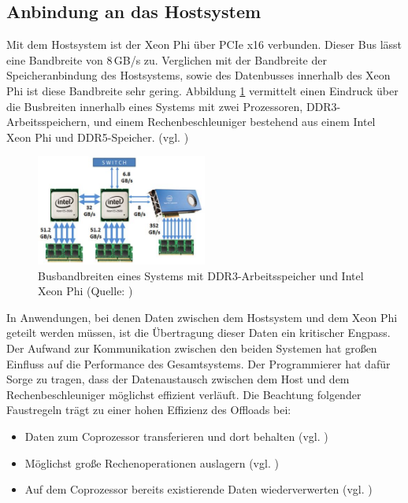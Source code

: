 \documentclass[../main.tex]{subfiles}
\begin{document}
\subsection{Anbindung an das Hostsystem}
Mit dem Hostsystem ist der Xeon Phi über PCIe x16 verbunden. Dieser Bus lässt eine Bandbreite von 8\,GB/s zu. Verglichen mit der Bandbreite der Speicheranbindung des Hostsystems, sowie des Datenbusses innerhalb des Xeon Phi ist diese Bandbreite sehr gering. Abbildung \ref{pic:xeonphiBandwidths} vermittelt einen Eindruck über die Busbreiten innerhalb eines Systems mit zwei Prozessoren, DDR3-Arbeitsspeichern, und einem Rechenbeschleuniger bestehend aus einem Intel Xeon Phi und DDR5-Speicher. (vgl. \cite{interDeviceCommunication})
\begin{figure}
    \centering 
       \includegraphics[width=0.5\textwidth]{../images/Schmidt/xeonphi_bandwidths.jpg} 
    \caption {Busbandbreiten eines Systems mit DDR3-Arbeitsspeicher und Intel Xeon Phi (Quelle: \parencite{interDeviceCommunication})}
    \label{pic:xeonphiBandwidths} 
\end{figure}
In Anwendungen, bei denen Daten zwischen dem Hostsystem und dem Xeon Phi geteilt werden müssen, ist die Übertragung dieser Daten ein kritischer Engpass. Der Aufwand zur Kommunikation zwischen den beiden Systemen hat großen Einfluss auf die Performance des Gesamtsystems. Der Programmierer hat dafür Sorge zu tragen, dass der Datenaustausch zwischen dem Host und dem Rechenbeschleuniger möglichst effizient verläuft. Die Beachtung folgender Faustregeln trägt zu einer hohen Effizienz des Offloads bei: 
\begin{itemize}
\item Daten zum Coprozessor transferieren und dort behalten (vgl. \cite{xeonphiJumpstart})
\item Möglichst große Rechenoperationen auslagern (vgl. \cite{xeonphiJumpstart})
\item Auf dem Coprozessor bereits existierende Daten wiederverwerten (vgl. \cite{xeonphiJumpstart})
\end{itemize}
\end{document}
